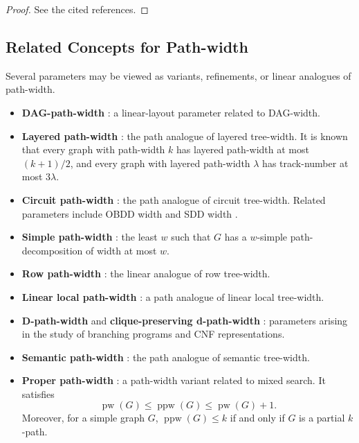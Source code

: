 \documentclass[10pt]{book}
\theoremstyle{definition}
\DeclareMathOperator{\pw}{pw}
\DeclareMathOperator{\ppw}{ppw}
\begin{document}
\begin{proof}
See the cited references.
\end{proof}

\subsection{Related Concepts for Path-width}
Several parameters may be viewed as variants, refinements, or linear analogues of path-width.

\begin{itemize}
    \item \textbf{DAG-path-width} \cite{141}: a linear-layout parameter related to DAG-width.

    \item \textbf{Layered path-width} \cite{157,159}: the path analogue of layered tree-width.  
    It is known that every graph with path-width \(k\) has layered path-width at most \((k+1)/2\), and every graph with layered path-width \(\lambda\) has track-number at most \(3\lambda\).

    \item \textbf{Circuit path-width} \cite{razgon2013cliquewidth,bova2017circuit}: the path analogue of circuit tree-width.  
    Related parameters include OBDD width and SDD width \cite{jha2012tractabilit,bova2017circuit}.

    \item \textbf{Simple path-width} \cite{biedl2023complexity}: the least \(w\) such that \(G\) has a \(w\)-simple path-decomposition of width at most \(w\).

    \item \textbf{Row path-width} \cite{157,158}: the linear analogue of row tree-width.

    \item \textbf{Linear local path-width} \cite{Dujmovi2018MinorclosedGC}: a path analogue of linear local tree-width.

    \item \textbf{D-path-width} and \textbf{clique-preserving d-path-width} \cite{201}: parameters arising in the study of branching programs and CNF representations.

    \item \textbf{Semantic path-width} \cite{206}: the path analogue of semantic tree-width.

    \item \textbf{Proper path-width} \cite{276,takahashi1994minimal,takahashi1995proper}: a path-width variant related to mixed search.  
    It satisfies
    \[
    \pw(G)\leq \ppw(G)\leq \pw(G)+1.
    \]
    Moreover, for a simple graph \(G\), \(\ppw(G)\leq k\) if and only if \(G\) is a partial \(k\)-path.


\end{itemize}
\end{document}
